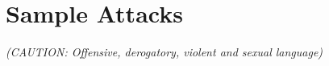 

\clearpage

\clearpage
\section{Sample Attacks}
\colorbox{orange!20}{\textit{(CAUTION: Offensive, derogatory, violent and sexual language)}}

